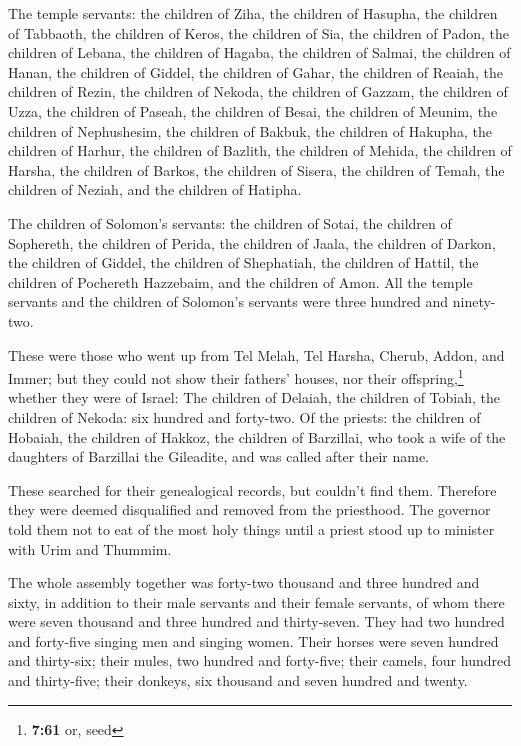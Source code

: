  The temple servants: the children of Ziha, the children
of Hasupha, the children of Tabbaoth,  the children of
Keros, the children of Sia, the children of Padon,  the
children of Lebana, the children of Hagaba, the children of Salmai,
 the children of Hanan, the children of Giddel, the
children of Gahar,  the children of Reaiah, the children
of Rezin, the children of Nekoda,  the children of
Gazzam, the children of Uzza, the children of Paseah, 
the children of Besai, the children of Meunim, the children of
Nephushesim,  the children of Bakbuk, the children of
Hakupha, the children of Harhur,  the children of
Bazlith, the children of Mehida, the children of Harsha, 
the children of Barkos, the children of Sisera, the children of Temah,
 the children of Neziah, and the children of Hatipha.

 The children of Solomon's servants: the children of
Sotai, the children of Sophereth, the children of Perida,
 the children of Jaala, the children of Darkon, the
children of Giddel,  the children of Shephatiah, the
children of Hattil, the children of Pochereth Hazzebaim, and the
children of Amon.  All the temple servants and the
children of Solomon's servants were three hundred and ninety-two.

 These were those who went up from Tel Melah, Tel Harsha,
Cherub, Addon, and Immer; but they could not show their fathers' houses,
nor their offspring,\footnote{\textbf{7:61} or, seed} whether they were
of Israel:  The children of Delaiah, the children of
Tobiah, the children of Nekoda: six hundred and forty-two.
 Of the priests: the children of Hobaiah, the children of
Hakkoz, the children of Barzillai, who took a wife of the daughters of
Barzillai the Gileadite, and was called after their name.

 These searched for their genealogical records, but
couldn't find them. Therefore they were deemed disqualified and removed
from the priesthood.  The governor told them not to eat
of the most holy things until a priest stood up to minister with Urim
and Thummim.

 The whole assembly together was forty-two thousand and
three hundred and sixty,  in addition to their male
servants and their female servants, of whom there were seven thousand
and three hundred and thirty-seven. They had two hundred and forty-five
singing men and singing women.  Their horses were seven
hundred and thirty-six; their mules, two hundred and forty-five;
 their camels, four hundred and thirty-five; their
donkeys, six thousand and seven hundred and twenty.

